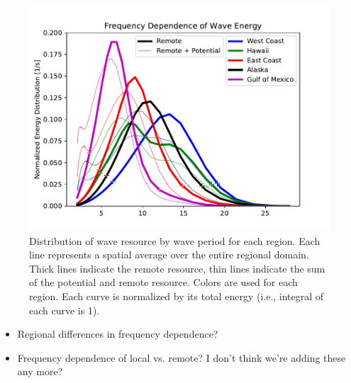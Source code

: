 \begin{figure}[ht]
  \centering
  \includegraphics[width=\linewidth]{../fig/TotalResource_Freq02.pdf}
  \caption[Distribution of wave energy vs. wave-period.]{Distribution of wave resource by wave period for each region. Each line represents a spatial average over the entire regional domain. Thick lines indicate the remote resource, thin lines indicate the sum of the potential and remote resource. Colors are used for each region. Each curve is normalized by its total energy (i.e., integral of each curve is 1).}
  \label{fig:remote-freq}
\end{figure}


\begin{itemize}
\item Regional differences in frequency dependence?
\item Frequency dependence of local vs. remote?
I don't think we're adding these any more?
\end{itemize}


